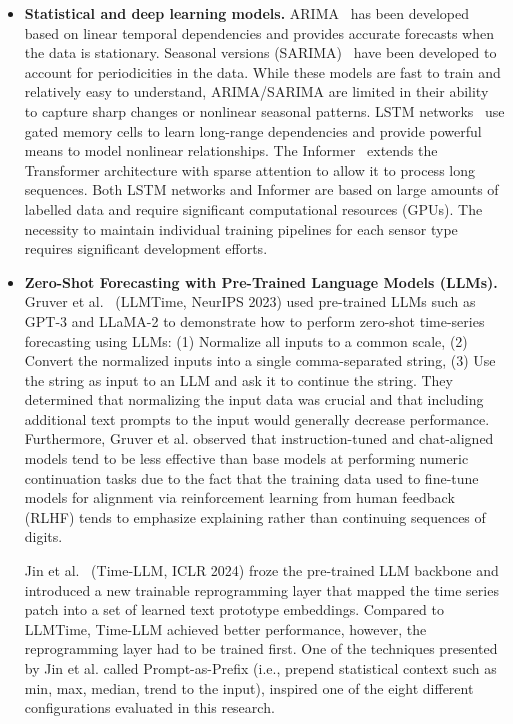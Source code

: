 \documentclass[11pt,a4paper]{article}
\begin{document}
\begin{itemize}[leftmargin=*,topsep=0pt,itemsep=-1ex,partopsep=1ex]

\item \textbf{Statistical and deep learning models.}
ARIMA~\cite{taslim2024arima} has been developed based on linear temporal dependencies and provides accurate forecasts when the data is stationary.
Seasonal versions (SARIMA)~\cite{li2022hybrid} have been developed to account for periodicities in the data.
While these models are fast to train and relatively easy to understand, ARIMA/SARIMA are limited in their ability to capture sharp changes or nonlinear seasonal patterns.
LSTM networks~\cite{wei2019autoencoder} use gated memory cells to learn long-range dependencies and provide powerful means to model nonlinear relationships.
The Informer~\cite{zhou2021informer} extends the Transformer architecture with sparse attention to allow it to process long sequences.
Both LSTM networks and Informer are based on large amounts of labelled data and require significant computational resources (GPUs).
The necessity to maintain individual training pipelines for each sensor type requires significant development efforts.

\item \textbf{Zero-Shot Forecasting with Pre-Trained Language Models (LLMs).}
Gruver et al.~\cite{gruver2023llmtime} (LLMTime, NeurIPS 2023) used pre-trained LLMs such as GPT-3 and LLaMA-2 to demonstrate how to perform zero-shot time-series forecasting using LLMs:
(1) Normalize all inputs to a common scale,
(2) Convert the normalized inputs into a single comma-separated string,
(3) Use the string as input to an LLM and ask it to continue the string.
They determined that normalizing the input data was crucial and that including additional text prompts to the input would generally decrease performance.
Furthermore, Gruver et al. observed that instruction-tuned and chat-aligned models tend to be less effective than base models at performing numeric continuation tasks due to the fact that the training data used to fine-tune models for alignment via reinforcement learning from human feedback (RLHF) tends to emphasize explaining rather than continuing sequences of digits.

Jin et al.~\cite{jin2024timellm} (Time-LLM, ICLR 2024) froze the pre-trained LLM backbone and introduced a new trainable reprogramming layer that mapped the time series patch into a set of learned text prototype embeddings.
Compared to LLMTime, Time-LLM achieved better performance, however, the reprogramming layer had to be trained first.
One of the techniques presented by Jin et al. called Prompt-as-Prefix (i.e., prepend statistical context such as min, max, median, trend to the input), inspired one of the eight different configurations evaluated in this research.


\end{itemize}
\end{document}
